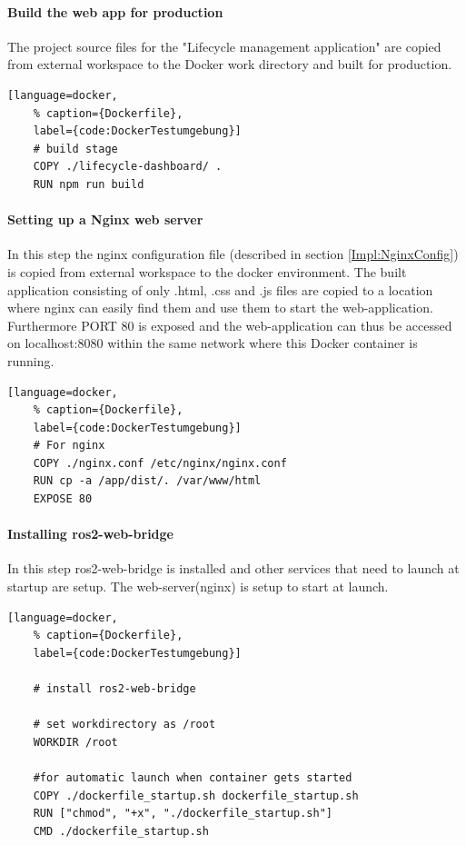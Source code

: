 \paragraph*{Build the web app for production} The project source files for the "Lifecycle management application" are copied from external workspace to the Docker work directory and built for production.
\begin{lstlisting}[language=docker,
	% caption={Dockerfile}, 
	label={code:DockerTestumgebung}]
	# build stage
	COPY ./lifecycle-dashboard/ .
	RUN npm run build
\end{lstlisting}

\paragraph{Setting up a Nginx web server} In this step the nginx configuration file (described in section \ref{Impl:NginxConfig}) is copied from external workspace to the docker environment. The built application consisting of only .html, .css and .js files are copied to a location where nginx can easily find them and use them to start the web-application. Furthermore PORT 80 is exposed and the web-application can thus be accessed on localhost:8080 within the same network where this Docker container is running.
\begin{lstlisting}[language=docker,
	% caption={Dockerfile}, 
	label={code:DockerTestumgebung}]
	# For nginx
	COPY ./nginx.conf /etc/nginx/nginx.conf
	RUN cp -a /app/dist/. /var/www/html
	EXPOSE 80
\end{lstlisting}

\paragraph*{Installing ros2-web-bridge} In this step ros2-web-bridge is installed and other services that need to launch at startup are setup. The web-server(nginx) is setup to start at launch.
\begin{lstlisting}[language=docker,
	% caption={Dockerfile}, 
	label={code:DockerTestumgebung}]
	
	# install ros2-web-bridge

	# set workdirectory as /root
	WORKDIR /root

	#for automatic launch when container gets started 
	COPY ./dockerfile_startup.sh dockerfile_startup.sh
	RUN ["chmod", "+x", "./dockerfile_startup.sh"]
	CMD ./dockerfile_startup.sh	
\end{lstlisting}


